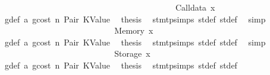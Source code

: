 \begin{isabellebody}
\isanewline
\ \ \ \ \ \ \ \ \ \ \ \ \ \ \isamarkupfalse%
\isanewline
\ \ \ \ \ \ \ \ \ \ \ \ \isamarkupfalse%
\isanewline
\ \ \ \ \ \ \ \ \ \ \ \ \ \ \isamarkupfalse%
\ {\isacharparenleft}{\kern0pt}Calldata\ x{}{\isacharparenright}{\kern0pt}\isanewline
\ \ \ \ \ \ \ \ \ \ \ \ \ \ \isamarkupfalse%
\ {}{\isacharparenleft}{\kern0pt}{}{\isacharparenright}{\kern0pt}\ g{\isacharunderscore}{\kern0pt}def\ a{}\ gcost\ n\ Pair\ KValue\ \isamarkupfalse%
\ {\isacharquery}{\kern0pt}thesis\ \isamarkupfalse%
\ stmt{\isachardot}{\kern0pt}psimps{\isacharparenleft}{\kern0pt}{}{\isacharparenright}{\kern0pt}\ st{\isacharprime}{\kern0pt}{\isacharunderscore}{\kern0pt}def\ st{\isacharprime}{\kern0pt}{\isacharprime}{\kern0pt}{\isacharunderscore}{\kern0pt}def\ \isamarkupfalse%
\ simp\isanewline
\ \ \ \ \ \ \ \ \ \ \ \ \isamarkupfalse%
\isanewline
\ \ \ \ \ \ \ \ \ \ \ \ \ \ \isamarkupfalse%
\ {\isacharparenleft}{\kern0pt}Memory\ x{}{\isacharparenright}{\kern0pt}\isanewline
\ \ \ \ \ \ \ \ \ \ \ \ \ \ \isamarkupfalse%
\ {}{\isacharparenleft}{\kern0pt}{}{\isacharparenright}{\kern0pt}\ g{\isacharunderscore}{\kern0pt}def\ a{}\ gcost\ n\ Pair\ KValue\ \isamarkupfalse%
\ {\isacharquery}{\kern0pt}thesis\ \isamarkupfalse%
\ stmt{\isachardot}{\kern0pt}psimps{\isacharparenleft}{\kern0pt}{}{\isacharparenright}{\kern0pt}\ st{\isacharprime}{\kern0pt}{\isacharunderscore}{\kern0pt}def\ st{\isacharprime}{\kern0pt}{\isacharprime}{\kern0pt}{\isacharunderscore}{\kern0pt}def\ \isamarkupfalse%
\ simp\isanewline
\ \ \ \ \ \ \ \ \ \ \ \ \isamarkupfalse%
\isanewline
\ \ \ \ \ \ \ \ \ \ \ \ \ \ \isamarkupfalse%
\ {\isacharparenleft}{\kern0pt}Storage\ x{}{\isacharparenright}{\kern0pt}\isanewline
\ \ \ \ \ \ \ \ \ \ \ \ \ \ \isamarkupfalse%
\ {}{\isacharparenleft}{\kern0pt}{}{\isacharparenright}{\kern0pt}\ g{\isacharunderscore}{\kern0pt}def\ a{}\ gcost\ n\ Pair\ KValue\ \isamarkupfalse%
\ {\isacharquery}{\kern0pt}thesis\ \isamarkupfalse%
\ stmt{\isachardot}{\kern0pt}psimps{\isacharparenleft}{\kern0pt}{}{\isacharparenright}{\kern0pt}\ st{\isacharprime}{\kern0pt}{\isacharunderscore}{\kern0pt}def\ st{\isacharprime}{\kern0pt}{\isacharprime}{\kern0pt}{\isacharunderscore}{\kern0pt}def\ \isamarkupfalse%

\end{isabellebody}
